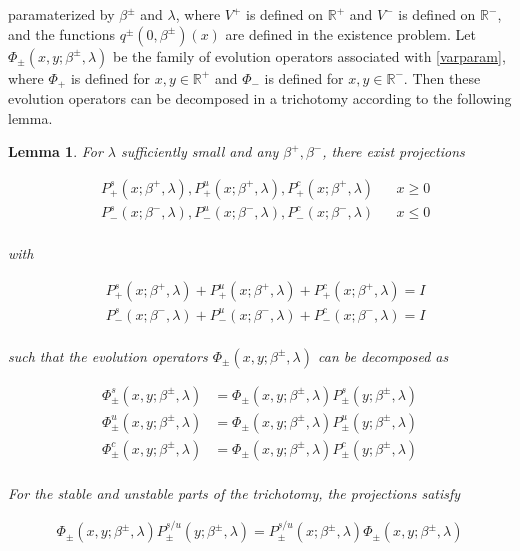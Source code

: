 \documentclass[12pt]{article}
\def\R{{\mathbb R}}
\newtheorem{lemma}{Lemma}
\begin{document}
paramaterized by $\beta^\pm$ and $\lambda$, where $V^+$ is defined on $\R^+$ and $V^-$ is defined on $\R^-$, and the functions $q^\pm(0, \beta^\pm)(x)$ are defined in the existence problem. Let $\Phi_\pm(x, y; \beta^\pm, \lambda)$ be the family of evolution operators associated with \eqref{varparam}, where $\Phi_+$ is defined for $x, y \in \R^+$ and $\Phi_-$ is defined for $x, y \in \R^-$. Then these evolution operators can be decomposed in a trichotomy according to the following lemma.


\begin{lemma}\label{trichotomy}
For $\lambda$ sufficiently small and any $\beta^+, \beta^-$, there exist projections

\begin{align*}
&P_+^s(x; \beta^+, \lambda), P_+^u(x; \beta^+, \lambda), P_+^c(x; \beta^+, \lambda) && x \geq 0 \\
&P_-^s(x; \beta^-, \lambda), P_-^u(x; \beta^-, \lambda), P_-^c(x; \beta^-, \lambda) && x \leq 0 \\
\end{align*}

with

\begin{align*}
&P_+^s(x; \beta^+, \lambda) + P_+^u(x; \beta^+, \lambda) + P_+^c(x; \beta^+, \lambda) = I \\
&P_-^s(x; \beta^-, \lambda) + P_-^u(x; \beta^-, \lambda) + P_-^c(x; \beta^-, \lambda) = I \\
\end{align*}

such that the evolution operators $\Phi_\pm(x, y; \beta^\pm, \lambda)$ can be decomposed as

\begin{align*}
\Phi^s_\pm(x, y; \beta^\pm, \lambda) &= \Phi_\pm(x, y; \beta^\pm, \lambda) P^s_\pm(y; \beta^\pm, \lambda) \\
\Phi^u_\pm(x, y; \beta^\pm, \lambda) &= \Phi_\pm(x, y; \beta^\pm, \lambda) P^u_\pm(y; \beta^\pm, \lambda) \\
\Phi^c_\pm(x, y; \beta^\pm, \lambda) &= \Phi_\pm(x, y; \beta^\pm, \lambda) P^c_\pm(y; \beta^\pm, \lambda) \\
\end{align*}

For the stable and unstable parts of the trichotomy, the projections satisfy 

\begin{align*}
\Phi_\pm(x, y; \beta^\pm, \lambda) P^{s/u}_\pm(y; \beta^\pm, \lambda) 
= P^{s/u}_\pm(x; \beta^\pm, \lambda) \Phi_\pm(x, y; \beta^\pm, \lambda)
\end{align*}


\end{lemma}
\end{document}
